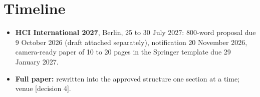 \documentclass[11pt,a4paper]{article}
\newcommand{\ph}[1]{\textcolor{red!65!black}{[#1]}}
\begin{document}
\section{Timeline}

\begin{itemize}
    \item \textbf{HCI International 2027}, Berlin, 25 to 30 July 2027:
    800-word proposal due 9 October 2026 (draft attached separately),
    notification 20 November 2026, camera-ready paper of 10 to 20 pages
    in the Springer template due 29 January 2027.
    \item \textbf{Full paper:} rewritten into the approved structure one
    section at a time; venue \ph{decision 4}.
\end{itemize}
\end{document}
